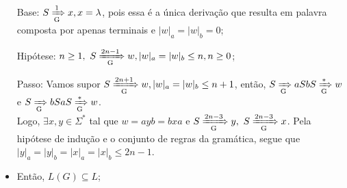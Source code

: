 \documentclass{homework}
\begin{document}
\begin{enumerate}
\begin{itemize}
					\begin{itemize}
						\item[Base:] $S \xRightarrow[\text{G}]{1} x, x = \lambda$, pois essa é a única derivação que resulta em palavra composta por apenas terminais e $|w|_a = |w|_ b = 0$;
						\item[Hipótese:]  $n \geq 1,\ S \xRightarrow[\text{G}]{2n -1} w, |w|_a=|w|_b \leq n, n \geq 0$;
						\item[Passo:] Vamos supor $S \xRightarrow[\text{G}]{2n+1} w, |w|_a=|w|_b \leq n + 1$, então, $S \xRightarrow[\text{G}]{} aSbS \xRightarrow[\text{G}]{*} w$ e $S \xRightarrow[\text{G}]{} bSaS \xRightarrow[\text{G}]{*} w$.\\
						Logo, $\exists x,y \in \Sigma^*$ tal que $w = ayb = bxa$ e $S \xRightarrow[\text{G}]{2n - 3} y,\ S \xRightarrow[\text{G}]{2n - 3} x$. Pela hipótese de indução e o conjunto de regras da gramática, segue que $|y|_a = |y|_b = |x|_a = |x|_b \leq 2n - 1$.
						\item Então, $L(G) \subseteq L$;
					\end{itemize}
			\end{itemize}
	\end{enumerate}

\pagebreak
\end{document}
